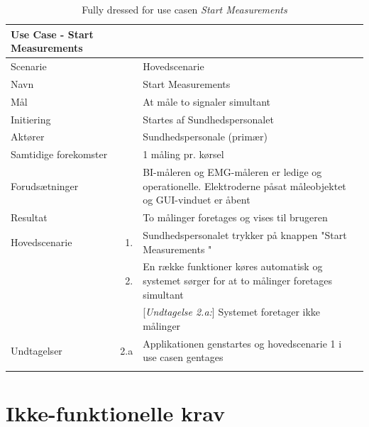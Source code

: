 \begin{longtabu} to  %
	{\large \textbf{Use Case - Start Measurements }} && \\
	\toprule
	Scenarie 				&&	Hovedscenarie\\
	Navn 					&& 	Start Measurements\\
	Mål 					&& 	At måle to signaler simultant \\
	Initiering 				&& 	Startes af Sundhedspersonalet\\
	Aktører 				&& 	Sundhedspersonale (primær)\\
	
	Samtidige forekomster  	&& 	1 måling pr. kørsel \\
	Forudsætninger 			&&	BI-måleren og EMG-måleren er ledige og operationelle. Elektroderne påsat måleobjektet og GUI-vinduet er åbent \\ 
	Resultat 				&& 	To målinger foretages og vises til brugeren\\ \midrule
	Hovedscenarie 			&    1. 	&	Sundhedspersonalet trykker på knappen "Start Measurements "\\				 	
							&    2. 	& 	En række funktioner køres automatisk og systemet sørger for at to målinger foretages simultant\\
	
	
	&&[\textit{Undtagelse 2.a:}] Systemet foretager ikke målinger\\ \midrule						
							
							
	Undtagelser 			&		2.a	& 	Applikationen genstartes og hovedscenarie 1 i use casen gentages \\ \bottomrule
	
	\caption{Fully dressed for use casen \textit{Start Measurements}}
	\label{UC1}
\end{longtabu}

\section{Ikke-funktionelle krav}


